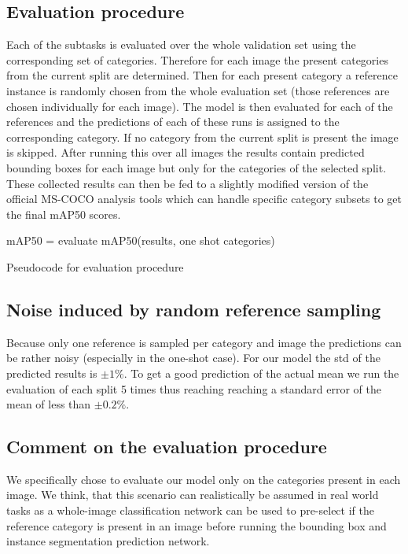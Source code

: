 \documentclass{article}
\newcommand{\coco}{MS-COCO\xspace}
\begin{document}
\subsection{Evaluation procedure}
Each of the subtasks is evaluated over the whole validation set using the corresponding set of categories. Therefore for each image the present categories from the current split are determined. Then for each present category a reference instance is randomly chosen from the whole evaluation set (those references are chosen individually for each image). The model is then evaluated for each of the references and the predictions of each of these runs is assigned to the corresponding category. If no category from the current split is present the image is skipped. After running this over all images the results contain predicted bounding boxes for each image but only for the categories of the selected split. These collected results can then be fed to a slightly modified version of the official \coco analysis tools \cite{Coco2018} which can handle specific category subsets to get the final mAP50 scores.

\begin{algorithm}[H]
 mAP50 = evaluate mAP50(results, one shot categories)\;
 \vspace{6pt}
 \caption{Pseudocode for evaluation procedure}
\end{algorithm}

\subsection{Noise induced by random reference sampling}
Because only one reference is sampled per category and image the predictions can be rather noisy (especially in the one-shot case). For our model the std of the predicted results is $\pm1\%$. To get a good prediction of the actual mean we run the evaluation of each split 5 times thus reaching reaching a standard error of the mean of less than $\pm0.2\%$.

\subsection{Comment on the evaluation procedure}
We specifically chose to evaluate our model only on the categories present in each image. We think, that this scenario can realistically be assumed in real world tasks as a whole-image classification network can be used to pre-select if the reference category is present in an image before running the bounding box and instance segmentation prediction network.
\end{document}
